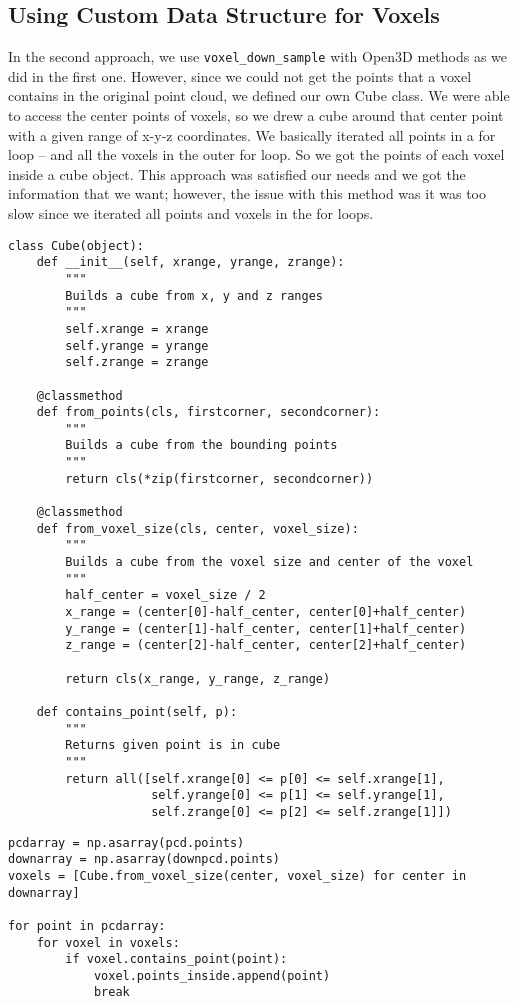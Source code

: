 \documentclass[a4paper]{article}
\begin{document}
\subsection{Using Custom Data Structure for Voxels}
In the second approach, we use \texttt{voxel\_down\_sample} with Open3D methods as we did in the first one. However, since we could not get the points that a voxel contains in the original point cloud, we defined our own Cube class. We were able to access the center points of voxels, so we drew a cube around that center point with a given range of x-y-z coordinates. We basically iterated all points in a for loop – and all the voxels in the outer for loop. So we got the points of each voxel inside a cube object. This approach was satisfied our needs and we got the information that we want; however, the issue with this method was it was too slow since we iterated all points and voxels in the for loops. 

\begin{lstlisting}[caption={Our initial custom voxel-like data structure named \texttt{Cube}.}]
class Cube(object):
    def __init__(self, xrange, yrange, zrange):
        """
        Builds a cube from x, y and z ranges
        """
        self.xrange = xrange
        self.yrange = yrange
        self.zrange = zrange

    @classmethod
    def from_points(cls, firstcorner, secondcorner):
        """
        Builds a cube from the bounding points
        """
        return cls(*zip(firstcorner, secondcorner))

    @classmethod
    def from_voxel_size(cls, center, voxel_size):
        """
        Builds a cube from the voxel size and center of the voxel
        """
        half_center = voxel_size / 2
        x_range = (center[0]-half_center, center[0]+half_center)
        y_range = (center[1]-half_center, center[1]+half_center)
        z_range = (center[2]-half_center, center[2]+half_center)
        
        return cls(x_range, y_range, z_range)

    def contains_point(self, p):
        """
        Returns given point is in cube
        """
        return all([self.xrange[0] <= p[0] <= self.xrange[1],
                    self.yrange[0] <= p[1] <= self.yrange[1],
                    self.zrange[0] <= p[2] <= self.zrange[1]])
\end{lstlisting}

\begin{lstlisting}[caption={Splitting our data into voxels using our \texttt{Cube} structure.}]
pcdarray = np.asarray(pcd.points)
downarray = np.asarray(downpcd.points)
voxels = [Cube.from_voxel_size(center, voxel_size) for center in downarray]

for point in pcdarray:
    for voxel in voxels:
        if voxel.contains_point(point):
            voxel.points_inside.append(point)
            break
\end{lstlisting}
\end{document}
